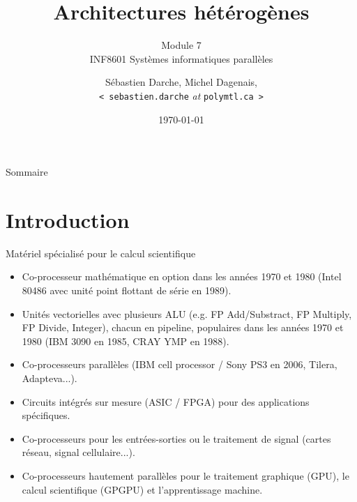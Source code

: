 \documentclass[10pt]{beamer}
\begin{document}

\title[]{Architectures hétérogènes} 
\subtitle{Module 7 \\
INF8601 Systèmes informatiques parallèles}
\author{Sébastien Darche, Michel Dagenais, \\\texttt{< sebastien.darche} \textit{at} \texttt{polymtl.ca >}} 
\date{\today} 

\begin{frame}[plain]
  \titlepage
\end{frame}

\begin{frame}{Sommaire}
  \tableofcontents
\end{frame}

\section{Introduction}

\begin{frame}{Matériel spécialisé pour le calcul scientifique}

  \begin{itemize}
    \item Co-processeur mathématique en option dans les années 1970 et 1980 (Intel 80486 avec unité point flottant de série en 1989).

    \item Unités vectorielles avec plusieurs ALU (e.g. FP Add/Substract, FP Multiply, FP Divide, Integer), chacun en pipeline, populaires dans les années 1970 et 1980 (IBM 3090 en 1985, CRAY YMP en 1988).

    \item Co-processeurs parallèles (IBM cell processor / Sony PS3 en 2006, Tilera, Adapteva...).

    \item Circuits intégrés sur mesure (ASIC / FPGA) pour des applications spécifiques.

    \item Co-processeurs pour les entrées-sorties ou le traitement de signal (cartes réseau, signal cellulaire...).

    \item Co-processeurs hautement parallèles pour le traitement graphique (GPU), le calcul scientifique (GPGPU) et l'apprentissage machine.
  \end{itemize}
\end{frame}
\end{document}

